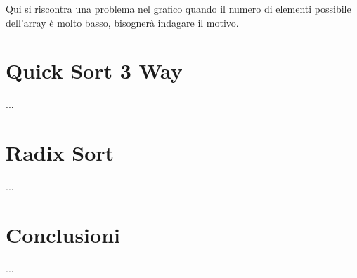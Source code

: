 \documentclass[a4paper, 12pt, oneside]{book}
\begin{document}
\noindent Qui si riscontra una problema nel grafico quando il numero di elementi possibile dell'array è molto basso, bisognerà indagare il motivo.


\chapter{Quick Sort 3 Way}\label{chap:Quick Sort 3 Way} %

...

\chapter{Radix Sort}\label{chap:Radix Sort} %

...

\chapter{Conclusioni}\label{chap:Conclusioni} %

...
\end{document}
